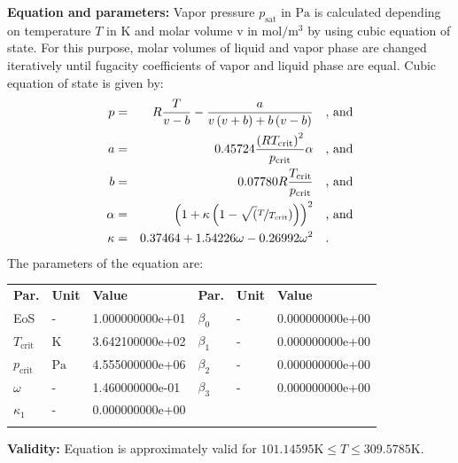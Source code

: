 \textbf{Equation and parameters:}
\newline
%
Vapor pressure $p_\mathrm{sat}$ in $\si{\pascal}$ is calculated depending on temperature $T$ in $\si{\kelvin}$ and molar volume v in $\si{\mole\per\cubic\meter}$ by using cubic equation of state. For this purpose, molar volumes of liquid and vapor phase are changed iteratively until fugacity coefficients of vapor and liquid phase are equal. Cubic equation of state is given by:
\begin{equation*}
\begin{split}
p &=& R \frac{T}{v - b} - \frac{a}{v \left(v + b\right) + b \left(v - b\right)} & \quad\text{, and} \\
a &=& 0.45724 \frac{\left(R T_\mathrm{crit} \right)^2}{p_\mathrm{crit}} \alpha & \quad\text{, and} \\
b &=& 0.07780 R \frac{T_\mathrm{crit}}{p_\mathrm{crit}} & \quad\text{, and} \\
\alpha &=& \left(1 + \kappa \left(1 - \sqrt(\nicefrac{T}{T_\mathrm{crit}}) \right) \right)^2 & \quad\text{, and} \\
\kappa &=& 0.37464 + 1.54226 \omega - 0.26992 \omega^2 & \quad\text{.}
\end{split}
\end{equation*}
%
The parameters of the equation are:
%
\begin{longtable}[l]{lll|lll}
\toprule
\addlinespace
\textbf{Par.} & \textbf{Unit} & \textbf{Value} &	\textbf{Par.} & \textbf{Unit} & \textbf{Value} \\
\addlinespace
\midrule
\endhead

\bottomrule
\endfoot
\bottomrule
\endlastfoot
\addlinespace

EoS & - & 1.000000000e+01 & $\beta_0$ & - & 0.000000000e+00 \\
$T_\mathrm{crit}$ & $\si{\kelvin}$ & 3.642100000e+02 & $\beta_1$ & - & 0.000000000e+00 \\
$p_\mathrm{crit}$ & $\si{\pascal}$ & 4.555000000e+06 & $\beta_2$ & - & 0.000000000e+00 \\
$\omega$ & - & 1.460000000e-01 & $\beta_3$ & - & 0.000000000e+00 \\
$\kappa_1$ & - & 0.000000000e+00 & & & \\

\addlinespace\end{longtable}

\textbf{Validity:}
\newline
Equation is approximately valid for $101.14595 \si{\kelvin} \leq T \leq 309.5785 \si{\kelvin}$.
\newline

